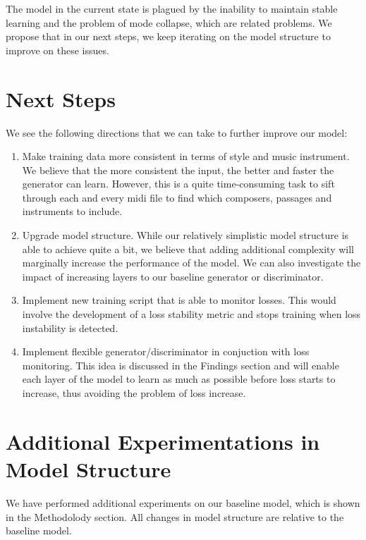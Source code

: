 \documentclass[12pt,oneside]{chicagocapstone}
\providecommand{\tightlist}{%
  \setlength{\itemsep}{0pt}\setlength{\parskip}{0pt}}
\begin{document}
The model in the current state is plagued by the inability to maintain stable learning and the problem of mode collapse, which are related problems. We propose that in our next steps, we keep iterating on the model structure to improve on these issues.

\hypertarget{next-steps}{%
\chapter*{Next Steps}\label{next-steps}}

We see the following directions that we can take to further improve our model:
\begin{enumerate}
\def\labelenumi{\arabic{enumi}.}
\tightlist
\item
  Make training data more consistent in terms of style and music instrument. We believe that the more consistent the input, the better and faster the generator can learn. However, this is a quite time-consuming task to sift through each and every midi file to find which composers, passages and instruments to include.
\item
  Upgrade model structure. While our relatively simplistic model structure is able to achieve quite a bit, we believe that adding additional complexity will marginally increase the performance of the model. We can also investigate the impact of increasing layers to our baseline generator or discriminator.
\item
  Implement new training script that is able to monitor losses. This would involve the development of a loss stability metric and stops training when loss instability is detected.
\item
  Implement flexible generator/discriminator in conjuction with loss monitoring. This idea is discussed in the Findings section and will enable each layer of the model to learn as much as possible before loss starts to increase, thus avoiding the problem of loss increase.
\end{enumerate}
\appendix

\hypertarget{additional-experimentations-in-model-structure}{%
\chapter{Additional Experimentations in Model Structure}\label{additional-experimentations-in-model-structure}}

We have performed additional experiments on our baseline model, which is shown in the Methodolody section. All changes in model structure are relative to the baseline model.
\end{document}
